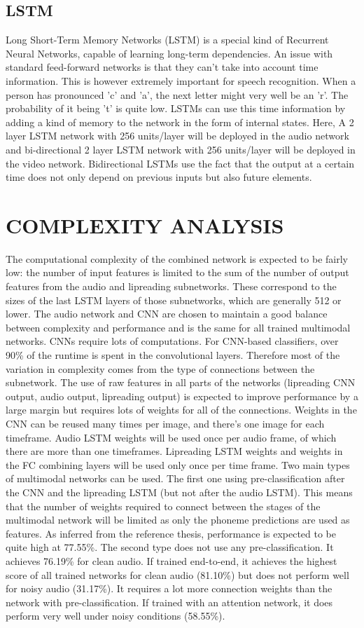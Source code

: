 \documentclass{article}
\begin{document}
\subsection{LSTM}
Long Short-Term Memory Networks (LSTM) is a special kind of Recurrent Neural Networks, capable of learning long-term dependencies. An issue with standard feed-forward networks is that they can’t take into account time information. This is however extremely important for speech recognition. When a person has pronounced ’c’ and ’a’, the next letter might very well be an ’r’. The probability of it being ’t’ is quite low. LSTMs can use this time information by adding a kind of memory to the network in the form of internal states. 
Here, A 2 layer LSTM network with 256 units/layer will be deployed in the audio network and bi-directional 2 layer LSTM network with 256 units/layer will be deployed in the video network. Bidirectional LSTMs use the fact that the output at a certain time does not only depend on previous inputs but also future elements.


\section{COMPLEXITY ANALYSIS}
The computational complexity of the combined network is expected to be fairly low: the number of input features is limited to the sum of the number of output features from the audio and lipreading subnetworks. These correspond to the sizes of the last LSTM layers of those subnetworks, which are generally 512 or lower. The audio network and CNN are chosen to maintain a good balance between complexity and performance and is the same for all trained multimodal networks. CNNs require lots of computations. For CNN-based classifiers, over 90\% of the runtime is spent in the convolutional layers. Therefore most of the variation in complexity comes from the type of connections between the subnetwork. The use of raw features in all parts of the networks (lipreading CNN output, audio output, lipreading output) is expected to improve performance by a large margin but requires lots of weights for all of the connections. Weights in the CNN can be reused many times per image, and there’s one image for each timeframe. Audio LSTM weights will be used once per audio frame, of which there are more than one timeframes. Lipreading LSTM weights and weights in the FC combining layers will be used only once per time frame.  
Two main types of multimodal networks can be used. The first one using pre-classification after the CNN and the lipreading LSTM (but not after the audio LSTM). This means that the number of weights required to connect between the stages of the multimodal network will be limited as only the phoneme predictions are used as features. As inferred from the reference thesis, performance is expected to be quite high at 77.55\%. The second type does not use any pre-classification. It achieves 76.19\% for clean audio. If trained end-to-end, it achieves the highest score of all trained networks for clean audio (81.10\%) but does not perform well for noisy audio (31.17\%). It requires a lot more connection weights than the network with pre-classification. If trained with an attention network, it does perform very well under noisy conditions (58.55\%).
\end{document}
